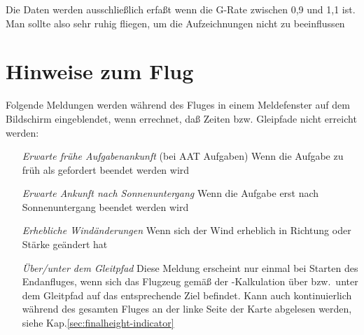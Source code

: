 Die Daten werden ausschließlich erfaßt wenn die G-Rate zwischen 0,9 und 1,1 ist.
Man sollte also sehr ruhig fliegen, um die Aufzeichnungen nicht zu beeinflussen


\section{Hinweise zum Flug}
Folgende Meldungen werden während des Fluges in einem
Meldefenster auf dem Bildschirm eingeblendet, wenn \xc errechnet, daß Zeiten bzw. Gleipfade nicht erreicht werden:

\begin{itemize}
\item[\textit{Erwarte frühe Aufgabenankunft}]  (bei AAT Aufgaben) Wenn die Aufgabe zu früh als gefordert beendet werden wird
\item[\textit{Erwarte Ankunft nach Sonnenuntergang}] Wenn die Aufgabe erst nach Sonnenuntergang beendet werden wird
\item[\textit{Erhebliche Windänderungen}] Wenn sich der Wind erheblich in Richtung oder Stärke geändert hat
\item[\textit{Über/unter dem Gleitpfad}]  Diese Meldung erscheint nur einmal bei Starten des Endanfluges, wenn sich das Flugzeug gemäß der \xc-Kalkulation über bzw.\ unter dem Gleitpfad auf das entsprechende Ziel befindet. 
Kann auch kontinuierlich während des gesamten Fluges an der linke Seite der Karte abgelesen werden, siehe Kap.\ref{sec:finalheight-indicator}
\end{itemize}
